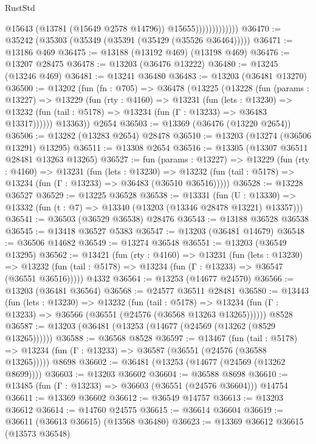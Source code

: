 \begin{lexlean}{RustStd}
\begin{coremodule}
                              @15643
                              (@13781 (@15649 @2578 @14796))
                              @15655)))))))))))))
@36470 := @35242 (@35303 (@35349 (@35391 (@35429 (@35526 @36464)))))
@36471 := @13186 @469
@36475 := @13188 (@13192 @469) (@13198 @469)
@36476 := @13207 @28475
@36478 := @13203 (@36476 @13222)
@36480 := @13245 (@13246 @469)
@36481 := @13241 @36480
@36483 := @13203 (@36481 @13270)
@36500 := @13202
    (fun (fn : @705) =>
    @36478
      (@13225
        (@13228
          (fun (params : @13227) =>
          @13229
            (fun (rty : @4160) =>
            @13231
              (fun (lets : @13230) =>
              @13232 (fun (tail : @5178) => @13234 (fun (Γ : @13233) => @36483 @13317))))))
        @13363))
    @2654
@36503 := @13369 (@36476 (@13220 @2654))
@36506 := @13282 (@13283 @2654) @28478
@36510 := @13203 (@13274 (@36506 @13291) @13295)
@36511 := @13308 @2654
@36516 := @13305 (@13307 @36511 @28481 @13263 @13265)
@36527 := fun (params : @13227) =>
  @13229
    (fun (rty : @4160) =>
    @13231
      (fun (lets : @13230) =>
      @13232 (fun (tail : @5178) => @13234 (fun (Γ : @13233) => @36483 (@36510 @36516)))))
@36528 := @13228 @36527
@36529 := @13225 @36528
@36538 := @13331
    (fun (U : @13330) => @13332 (fun (t : @7) => @13340 (@13203 (@13346 @28478 @13221) @13357)))
@36541 := @36503 (@36529 @36538) @28476
@36543 := @13188 @36528 @36538
@36545 := @13418 @36527 @5383
@36547 := @13203 (@36481 @14679)
@36548 := @36506 @14682
@36549 := @13274 @36548
@36551 := @13203 (@36549 @13295)
@36562 := @13421
    (fun (rty : @4160) =>
    @13231
      (fun (lets : @13230) =>
      @13232 (fun (tail : @5178) => @13234 (fun (Γ : @13233) => @36547 (@36551 @36516)))))
    @4332
@36564 := @13253 (@14677 @24570)
@36566 := @13203 (@36481 @36564)
@36568 := @24577 @36511 @28481
@36580 := @13443
    (fun (lets : @13230) =>
    @13232
      (fun (tail : @5178) =>
      @13234 (fun (Γ : @13233) => @36566 (@36551 (@24576 (@36568 @13263 @13265))))))
    @8528
@36587 := @13203 (@36481 (@13253 (@14677 (@24569 (@13262 (@8529 @13265))))))
@36588 := @36568 @8528
@36597 := @13467
    (fun (tail : @5178) => @13234 (fun (Γ : @13233) => @36587 (@36551 (@24576 (@36588 @13265)))))
    @8698
@36602 := @36481 (@13253 (@14677 (@24569 (@13262 @8699))))
@36603 := @13203 @36602
@36604 := @36588 @8698
@36610 := @13485 (fun (Γ : @13233) => @36603 (@36551 (@24576 @36604))) @14754
@36611 := @13369 @36602
@36612 := @36549 @14757
@36613 := @13203 @36612
@36614 := @14760 @24575
@36615 := @36614 @36604
@36619 := @36611 (@36613 @36615) (@13568 @36480)
@36623 := @13369 @36612 @36615 (@13573 @36548)

\end{coremodule}
\end{lexlean}
